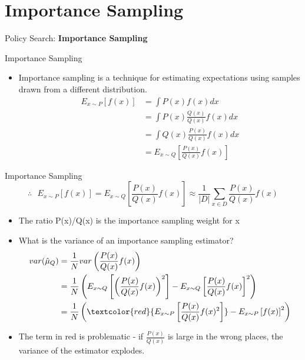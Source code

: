 \section{Importance Sampling}
\begin{frame}{}
    \LARGE Policy Search: \textbf{Importance Sampling}
\end{frame}

\begin{frame}{Importance Sampling}
\begin{itemize}
    \item Importance sampling is a technique for estimating expectations using samples drawn from a different distribution.
    \begin{equation*}
    \begin{split}
        E_{x \sim P}[f(x)] & = \int P(x)f(x) dx \\
        & = \int P(x)\frac{Q(x)}{Q(x)}f(x) dx \\
        & = \int Q(x)\frac{P(x)}{Q(x)}f(x) dx \\
        & = E_{x \sim Q} \left [\frac{P(x)}{Q(x)}f(x) \right ]
    \end{split}
    \end{equation*}
    
\end{itemize}
    
\end{frame}

\begin{frame}{Importance Sampling}
    $$\therefore \: \: \: E_{x \sim P}[f(x)] = E_{x \sim Q}\left [ \frac{P(x)}{Q(x)}f(x) \right ] \approx \frac{1}{|D|}\sum_{x \in D} \frac{P(x)}{Q(x)}f(x)$$
\begin{itemize}
    \item The ratio P(x)/Q(x) is the importance sampling weight for x
    \pause
    \item What is the variance of an importance sampling estimator?
    \begin{equation*}
    \begin{split}
        var(\hat{\mu}_Q) & = \frac{1}{N} var \left ( \frac{P(x)}{Q(x)}f(x) \right )  \\
        & = \frac{1}{N} \left ( E_{x \sim Q} \left [\left ( \frac{P(x)}{Q(x)}f(x) \right )^2 \right ]  - E_{x \sim Q} \left [\frac{P(x)}{Q(x)}f(x) \right ]^2 \right ) \\
        & = \frac{1}{N} \left ( \textcolor{red}{ E_{x \sim P} \left [ \frac{P(x)}{Q(x)} f(x)^2 \right ] }  - E_{x \sim P} \left [f(x) \right ]^2 \right ) \\
    \end{split}
    \end{equation*}
    \pause
    \item The term in red is problematic - if $\frac{P(x)}{Q(x)}$ is large in the wrong places, the variance of the estimator explodes.
    
\end{itemize}
    
\end{frame}

